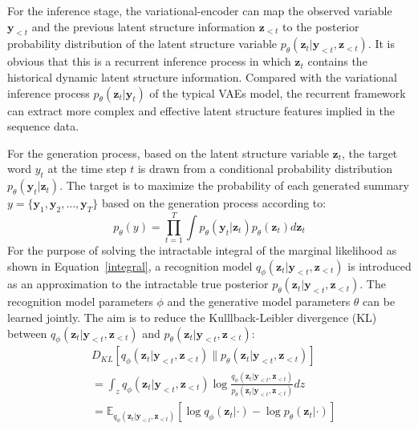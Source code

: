 \documentclass[11pt,letterpaper]{article}
\begin{document}
For the inference stage, the variational-encoder can map the observed variable $\mathbf{y}_{<t}$ and the previous latent structure information $\mathbf{z}_{<t}$  to the posterior probability distribution of the latent structure variable $p_\theta(\mathbf{z}_t|\mathbf{y}_{<t},\mathbf{z}_{<t})$.
It is obvious that this is a recurrent inference process in which $\mathbf{z}_t$ contains the historical dynamic latent structure information.
Compared with the variational inference process $p_\theta(\mathbf{z}_t|\mathbf{y}_{t})$ of the typical VAEs model,
the recurrent framework can extract more complex and effective latent structure features implied in the sequence data.   

For the generation process, based on the latent structure variable $\mathbf{z}_t$, the target word $y_t$ at the time step $t$ is drawn from a conditional probability distribution $p_\theta(\mathbf{y}_t|\mathbf{z}_t)$.
The target is to maximize the probability of each generated summary $y = \{\mathbf{y}_1, \mathbf{y}_2, \ldots, \mathbf{y}_T \}$ based on the generation process according to:
\begin{equation}
\label{integral}
{p_\theta }(y) = \prod\limits_{t = 1}^T {\int {{p_\theta }({{\mathbf{y}}_t}|{{\mathbf{z}}_t}){p_\theta }({{\mathbf{z}}_t})d{{\mathbf{z}}_t}} } 
\end{equation}
For the purpose of solving the intractable integral of the marginal likelihood as shown in Equation~\ref{integral}, a recognition model $q_\phi(\mathbf{z}_t|\mathbf{y}_{<t},\mathbf{z}_{<t})$ is introduced as an approximation to the intractable true posterior $p_\theta(\mathbf{z}_t|\mathbf{y}_{<t},\mathbf{z}_{<t})$.
The recognition model parameters $\phi$ and the generative model parameters $\theta$ can be learned jointly. The aim is to reduce the Kulllback-Leibler divergence (KL) between $q_\phi(\mathbf{z}_t|\mathbf{y}_{<t},\mathbf{z}_{<t})$ and $p_\theta(\mathbf{z}_t|\mathbf{y}_{<t},\mathbf{z}_{<t})$:
\[
\begin{split}
&{D_{KL}}[q_\phi(\mathbf{z}_t|\mathbf{y}_{<t},\mathbf{z}_{<t})\|p_\theta(\mathbf{z}_t|\mathbf{y}_{<t},\mathbf{z}_{<t})] \\ 
&= \int_z {q_\phi(\mathbf{z}_t|\mathbf{y}_{<t},\mathbf{z}_{<t})\log \frac{{q_\phi(\mathbf{z}_t|\mathbf{y}_{<t},\mathbf{z}_{<t})}}{{p_\theta(\mathbf{z}_t|\mathbf{y}_{<t},\mathbf{z}_{<t})}}dz} \\
&= {\mathbb{E}_{q_\phi(\mathbf{z}_t|\mathbf{y}_{<t},\mathbf{z}_{<t})}}[\log q_\phi(\mathbf{z}_t|\cdot) - \log p_\theta(\mathbf{z}_t|\cdot)]
\end{split}
\]
\end{document}
